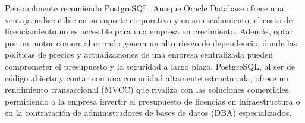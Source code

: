 Personalmente recomiendo PostgreSQL. Aunque Oracle Database ofrece una ventaja indiscutible en su soporte corporativo y en su escalamiento, el costo de licenciamiento no es accesible para una empresa en crecimiento. Además, optar por un motor comercial cerrado genera un alto riesgo de dependencia, donde las políticas de precios y actualizaciones de una empresa centralizada pueden comprometer el presupuesto y la seguridad a largo plazo. PostgreSQL, al ser de código abierto y contar con una comunidad altamente estructurada, ofrece un rendimiento transaccional (MVCC) que rivaliza con las soluciones comerciales, permitiendo a la empresa invertir el presupuesto de licencias en infraestructura o en la contratación de administradores de bases de datos (DBA) especializados.
